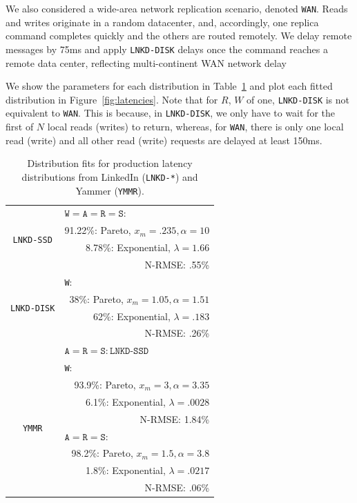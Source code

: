 \documentclass{vldb}
\begin{document}
We also considered a wide-area network replication scenario, denoted
\texttt{WAN}.  Reads and writes originate in a random datacenter, and,
accordingly, one replica command completes quickly and the others are
routed remotely.  We delay remote messages by 75ms and
apply \texttt{LNKD-DISK} delays once the command reaches a remote data
center, reflecting multi-continent WAN network
delay~\cite{dean-keynote}

We show the parameters for each distribution in
Table~\ref{table:fits} and plot each fitted distribution in
Figure~\ref{fig:latencies}.  Note that for $R$, $W$ of one,
\texttt{LNKD-DISK} is not equivalent to \texttt{WAN}.  This is
because, in \texttt{LNKD-DISK}, we only have to wait for the first of
$N$ local reads (writes) to return, whereas, for \texttt{WAN}, there
is only one local read (write) and all other read (write) requests are
delayed at least 150ms.


\begin{table}
\centering
\begin{tabular}{|c|r|}
\hline
\multirow{4}{*}{\texttt{LNKD-SSD}} & \multicolumn{1}{|l|}{$\texttt{W} = \texttt{A}= \texttt{R} = \texttt{S}:$} \\
& 91.22\%: Pareto, $x_m=.235, \alpha=10$\\
& 8.78\%: Exponential, $\lambda = 1.66$ \\
& N-RMSE: .55\%\\\hline
\multirow{4}{*}{\texttt{LNKD-DISK}} & 
 \multicolumn{1}{|l|}{\texttt{W}:}\\
& 38\%: Pareto, $x_m=1.05, \alpha=1.51$\\
& \hfill 62\%: Exponential, $\lambda = .183$ \\
& N-RMSE: .26\%\\\cline{2-2}
& \multicolumn{1}{|l|}{$\texttt{A}= \texttt{R} = \texttt{S}: \texttt{LNKD-SSD}$}\\
\hline
\multirow{8}{*}{\texttt{YMMR}} & \multicolumn{1}{|l|}{\texttt{W}:} \\
& 93.9\%: Pareto, $x_m=3, \alpha=3.35$\\
& 6.1\%: Exponential, $\lambda = .0028$ \\
& N-RMSE: 1.84\%\\\cline{2-2}
& \multicolumn{1}{|l|}{$\texttt{A}= \texttt{R} = \texttt{S}:$}\\
& 98.2\%: Pareto, $x_m=1.5, \alpha=3.8$\\
& 1.8\%: Exponential, $\lambda=.0217$\\
& N-RMSE: .06\%\\
\hline
\end{tabular}
\vspace{-6pt}
\caption{Distribution fits for production latency distributions from LinkedIn (\texttt{LNKD-*}) and Yammer (\texttt{YMMR}).}
\vspace{-12pt}
\label{table:fits}
\end{table}
\end{document}
